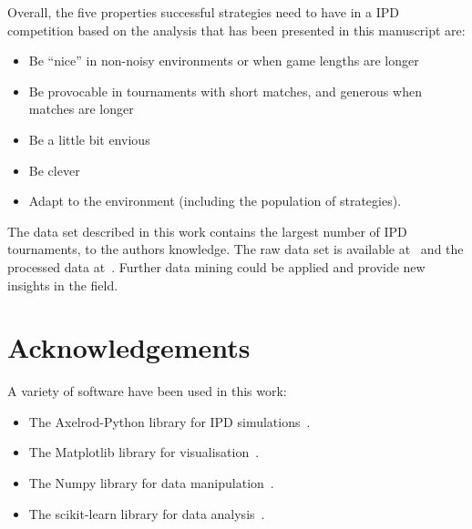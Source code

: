 \documentclass{article}
\begin{document}
Overall, the five properties successful strategies need to have in a IPD competition
based on the analysis that has been presented in this manuscript are:

\begin{itemize}
    \item Be ``nice'' in non-noisy environments or when game lengths are longer
    \item Be provocable in tournaments with short matches, and generous when matches are longer
    \item Be a little bit envious
    \item Be clever
    \item Adapt to the environment (including the population of strategies).
\end{itemize}

The data set described in this work contains the largest number of IPD tournaments,
to the authors knowledge. The raw data set is available at~\cite{raw_data} and the
processed data at~\cite{data}. Further data mining
could be applied and provide new insights in the field.




\section{Acknowledgements}

A variety of software have been used in this work:

\begin{itemize}
    \item The Axelrod-Python library for IPD simulations~\cite{axelrodproject}.
    \item The Matplotlib library for visualisation~\cite{hunter2007matplotlib}.
    \item The Numpy library for data manipulation~\cite{walt2011numpy}.
    \item The scikit-learn library for data analysis~\cite{scikit-learn}.
\end{itemize}

\appendix






\end{document}
